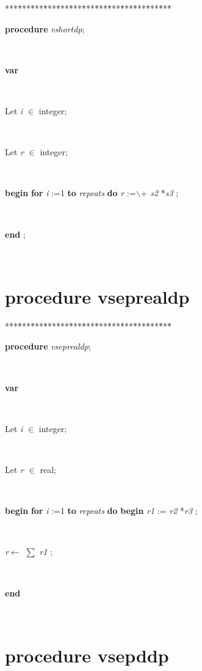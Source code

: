 \documentclass[10pt, a4paper]{article}
\begin{document}
\begin{tabbing}
***\=***\=***\=***\=***\=***\=***\=***\=***\=***\=***\=***\=***\=\kill
\parbox{14cm}{\textsf {\textbf {procedure } \textsf{\textit{vshortdp}}; }}\\
\+\parbox{14cm}{\textsf{\textbf{var} }}\\
\parbox{14cm}{\textsf{Let \textit{i} $\in$ integer;}}\\
\parbox{14cm}{\textsf{Let \textit{r} $\in$ integer;}}\\
\-\<\+\parbox{14cm}{\textsf{\textbf{begin}      \textbf{for}  \textit{i} :=1 \textbf{to}  \textit{repeats}  \textbf{do}  \textit{r} :=$ \backslash $+ \textit{s2} *\textit{s3} ;}}\\
\<\-\parbox{14cm}{\textsf{\textbf{end} ;}}\\
\end{tabbing}
\section{procedure vseprealdp}\label{sec:vectest/dovectestvseprealdp}

\begin{tabbing}
***\=***\=***\=***\=***\=***\=***\=***\=***\=***\=***\=***\=***\=\kill
\parbox{14cm}{\textsf {\textbf {procedure } \textsf{\textit{vseprealdp}}; }}\\
\+\parbox{14cm}{\textsf{\textbf{var} }}\\
\parbox{14cm}{\textsf{Let \textit{i} $\in$ integer;}}\\
\parbox{14cm}{\textsf{Let \textit{r} $\in$ real;}}\\
\-\<\+\parbox{14cm}{\textsf{\textbf{begin}      \textbf{for}  \textit{i} :=1 \textbf{to}  \textit{repeats}  \textbf{do}  \textbf{begin}  \textit{r1} := \textit{r2} *\textit{r3} ;}}\\
\parbox{14cm}{\textsf{\textit{r}$\leftarrow$  $\sum$  \textit{r1} }; }\\
\<\-\parbox{14cm}{\textsf{\textbf{end} }}\\
\end{tabbing}
\section{procedure vsepddp}\label{sec:vectest/dovectestvsepddp}
\end{document}
